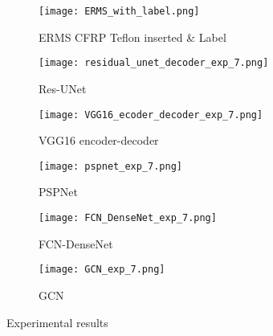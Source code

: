 \begin{figure} [!h]
	\centering
	\begin{subfigure}[b]{0.47\textwidth}
		\centering
		\texttt{[image: ERMS\_with\_label.png]}
		\caption{ERMS CFRP Teflon inserted \& Label}
		\label{fig:Delamination}	
	\end{subfigure}	
	\hfill
	\begin{subfigure}[b]{0.47\textwidth}
		\centering
		\texttt{[image: residual\_unet\_decoder\_exp\_7.png]}
		\caption{Res-UNet} 
		\label{fig:unet_exp_7_}
	\end{subfigure}
	\hfill
	\begin{subfigure}[b]{0.47\textwidth}
		\centering
		\texttt{[image: VGG16\_ecoder\_decoder\_exp\_7.png]}
		\caption{VGG16 encoder-decoder} 
		\label{fig:vgg16_exp_7_}
	\end{subfigure}
	\hfill
	\begin{subfigure}[b]{0.47\textwidth}
		\centering
		\texttt{[image: pspnet\_exp\_7.png]}
		\caption{PSPNet} 
		\label{fig:pspnet_exp_7_}
	\end{subfigure}
	\hfill
	\begin{subfigure}[b]{0.47\textwidth}
		\centering
		\texttt{[image: FCN\_DenseNet\_exp\_7.png]}
		\caption{FCN-DenseNet} 
		\label{fig:fcn_densenet_exp}
	\end{subfigure}
	\hfill
	\begin{subfigure}[b]{0.47\textwidth}
		\centering
		\texttt{[image: GCN\_exp\_7.png]}
		\caption{GCN} 
		\label{fig:gcn_exp}
	\end{subfigure}
	\caption{Experimental results}
	\label{fig:Exp_ERMS_teflon}
\end{figure}
\clearpage

